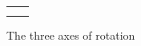 \begin{figure}
\begin{tabular}{p{7.2cm}p{7.2cm}}
\begin{center}
\label{fig:fly}\\
\end{center}
\end{tabular}
\caption{The three axes of rotation}
\end{figure}

